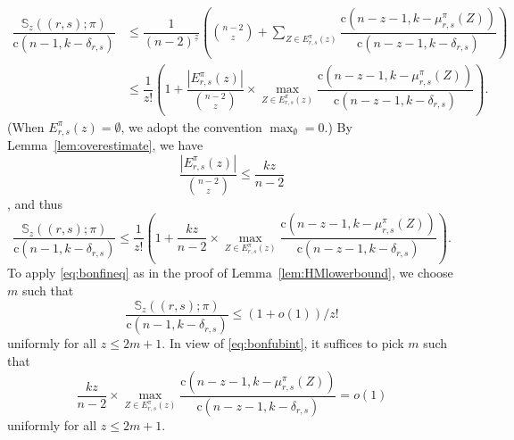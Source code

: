 \documentclass{amsart}
\newcommand{\bb}{\mathbb}
\newcommand{\st}{\mathrm{c}}
\newcommand{\ff}[1]{^{\underline{#1}}}
\begin{document}
\begin{align*}
\dfrac{\bb{S}_{z}((r,s);\pi)}{\st(n-1,k-\delta_{r,s})}&\leq \dfrac{1}{(n-2)\ff{z}}\left(\binom{n-2}{z}+ \sum\limits_{Z \in E_{r,s}^{\pi}(z)}\dfrac{\st(n-z-1,k-\mu_{r,s}^{\pi}(Z))}{\st(n-z-1,k-\delta_{r,s})} \right)\\
&\leq \dfrac{1}{z!}\left(1 + \dfrac{|E_{r,s}^{\pi}(z)|}{\binom{n-2}{z}}\times \max\limits_{Z \in E_{r,s}^{\pi}(z)}\dfrac{\st(n-z-1,k-\mu_{r,s}^{\pi}(Z))}{\st(n-z-1,k-\delta_{r,s})} \right).
\end{align*}(When $E_{r,s}^{\pi}(z)=\emptyset$, we adopt the convention $\max_{\emptyset}=0$.)
By Lemma~\ref{lem:overestimate}, we have \[\dfrac{|E_{r,s}^{\pi}(z)|}{\binom{n-2}{z}} \leq \dfrac{kz}{n-2}\], and thus
\begin{equation}\label{eq:bonfubint}
\dfrac{\bb{S}_{z}((r,s);\pi)}{\st(n-1,k-\delta_{r,s})}\leq \dfrac{1}{z!}\left(1 + \dfrac{kz}{n-2}\times \max\limits_{Z \in E_{r,s}^{\pi}(z)}\dfrac{\st(n-z-1,k-\mu_{r,s}^{\pi}(Z))}{\st(n-z-1,k-\delta_{r,s})} \right).
\end{equation}
To apply \eqref{eq:bonfineq} as in the proof of Lemma~\ref{lem:HMlowerbound}, we choose $m$  such that \[\dfrac{\bb{S}_{z}((r,s);\pi)}{\st(n-1,k-\delta_{r,s})}\leq (1+o(1))/z!\] uniformly for all $z\leq 2m+1$. In view of \eqref{eq:bonfubint}, it suffices to pick $m$ such that 
\begin{equation}\label{eq:ideal}
\dfrac{kz}{n-2}\times \max\limits_{Z \in E_{r,s}^{\pi}(z)}\dfrac{\st(n-z-1,k-\mu_{r,s}^{\pi}(Z))}{\st(n-z-1,k-\delta_{r,s})}=o(1)
\end{equation}
 uniformly for all $z\leq 2m+1$. 
\end{document}
